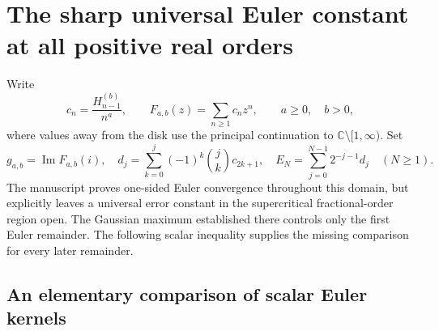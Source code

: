 
\section{The sharp universal Euler constant at all positive real orders}
\label{newEuler:sec}

Write
\[
 c_n=\frac{H_{n-1}^{(b)}}{n^a},\qquad
 F_{a,b}(z)=\sum_{n\ge1}c_nz^n,
 \qquad a\ge0,\quad b>0,
\]
where values away from the disk use the principal continuation to
$\mathbb C\setminus[1,\infty)$. Set
\[
 g_{a,b}=\operatorname{Im}F_{a,b}(i),\quad
 d_j=\sum_{k=0}^j(-1)^k\binom jk c_{2k+1},\quad
 E_N=\sum_{j=0}^{N-1}2^{-j-1}d_j\quad(N\ge1).
\]
The manuscript proves one-sided Euler convergence throughout this domain,
but explicitly leaves a universal error constant in the supercritical
fractional-order region open. The Gaussian maximum established there
controls only the first Euler remainder. The following scalar inequality
supplies the missing comparison for every later remainder.

\subsection{An elementary comparison of scalar Euler kernels}

